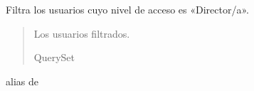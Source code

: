 \documentclass[letterpaper,10pt,spanish]{sphinxmanual}
\begin{document}
\begin{fulllineitems}
\begin{fulllineitems}

\pysigstartsignatures
{}
\pysigstopsignatures
\sphinxAtStartPar
Filtra los usuarios cuyo nivel de acceso es «Director/a».
\begin{quote}\begin{description}
\sphinxAtStartPar
Los usuarios filtrados.

\sphinxAtStartPar
QuerySet

\end{description}\end{quote}

\end{fulllineitems}



\begin{fulllineitems}

\pysigstartsignatures
{}
\pysigstopsignatures
\sphinxAtStartPar
alias de 

\end{fulllineitems}



\begin{fulllineitems}

\pysigstartsignatures
{}
\pysigstopsignatures
\end{fulllineitems}


\end{fulllineitems}
\end{document}
